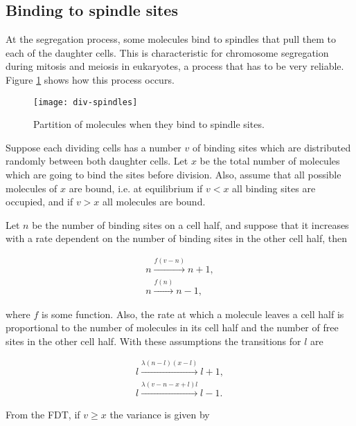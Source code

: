 \subsection{Binding to spindle sites}

At the segregation process, some molecules bind to spindles that pull them to each of the daughter cells. This is characteristic for chromosome segregation during mitosis and meiosis in eukaryotes, a process that has to be very reliable. Figure \ref{fig:div-spindles} shows how this process occurs.

\begin{figure}[H]
  \centering
  \texttt{[image: div-spindles]}
  \caption[Partition of molecules when they bind to spindle sites]{\label{fig:div-spindles} Partition of molecules when they bind to spindle sites.}
\end{figure}

Suppose each dividing cells has a number $v$ of binding sites which are distributed randomly between both daughter cells. Let $x$ be the total number of molecules which are going to bind the sites before division. Also, assume that all possible molecules of $x$ are bound, i.e. at equilibrium if $v<x$ all binding sites are occupied, and if $v>x$ all molecules are bound.

Let $n$ be the number of binding sites on a cell half, and suppose that it increases with a rate dependent on the number of binding sites in the other cell half, then

\begin{equation*}
  \begin{split}
    n\xrightarrow{f(v-n)}n+1,\\
    n\xrightarrow{f(n)}n-1,
  \end{split}
\end{equation*}

where $f$ is some function. Also, the rate at which a molecule leaves a cell half is proportional to the number of molecules in its cell half and the number of free sites in the other cell half. With these assumptions the transitions for $l$ are

\begin{equation*}
  \begin{split}
    l\xrightarrow{\lambda(n-l)(x-l)}l+1,\\
    l\xrightarrow{\lambda(v-n-x+l)l}l-1.
  \end{split}
\end{equation*}

From the FDT, if $v\geq x$ the variance is given by

